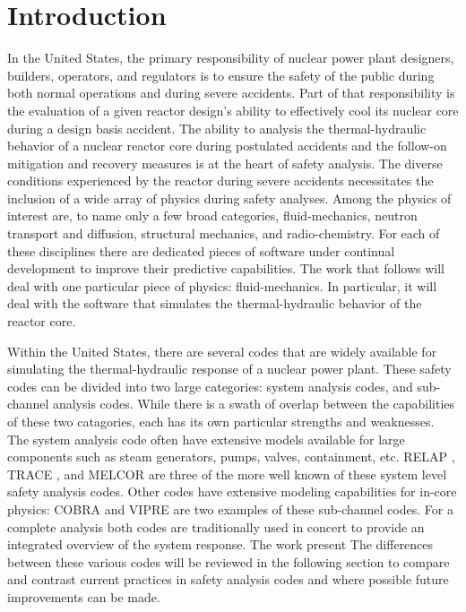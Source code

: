 \chapter{Introduction}
\label{chap:intro}
In the United States, the primary responsibility of nuclear power plant designers, builders, operators, and regulators is to ensure the safety of the public during both normal operations and during severe accidents.
Part of that responsibility is the evaluation of a given reactor design's ability to effectively cool its nuclear core during a design basis accident.
The ability to analysis the thermal-hydraulic behavior of a nuclear reactor core during postulated accidents and the follow-on mitigation and recovery measures is at the heart of safety analysis.
The diverse conditions experienced by the reactor during severe accidents necessitates the inclusion of a wide array of physics during safety analyses.
Among the physics of interest are, to name only a few broad categories, fluid-mechanics, neutron transport and diffusion, structural mechanics, and radio-chemistry.
For each of these disciplines there are dedicated pieces of software under continual development to improve their predictive capabilities.
The work that follows will deal with one particular piece of physics: fluid-mechanics.
In particular, it will deal with the software that simulates the thermal-hydraulic behavior of the reactor core.

Within the United States, there are several codes that are widely available for simulating the thermal-hydraulic response of a nuclear power plant.
These safety codes can be divided into two large categories: system analysis codes, and sub-channel analysis codes.
While there is a swath of overlap between the capabilities of these two catagories, each has its own particular strengths and weaknesses.
The system analysis code often have extensive models available for large components such as steam generators, pumps, valves, containment, etc.
RELAP \cite{RELAP}, TRACE \cite{TRACE}, and MELCOR \cite{MELCOR} are three of the more well known of these system level safety analysis codes.
Other codes have extensive modeling capabilities for in-core physics: COBRA \cite{Thurgood1983c} and VIPRE \cite{VIPRE} are two examples of these sub-channel codes.
For a complete analysis both codes are traditionally used in concert to provide an integrated overview of the system response.
The work present
The differences between these various codes will be reviewed in the following section to compare and contrast current practices in safety analysis codes and where possible future improvements can be made.

